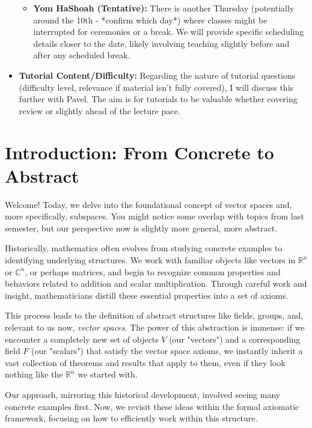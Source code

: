 \documentclass[11pt]{article}
\theoremstyle{definition}
\theoremstyle{remark}
\begin{document}
\begin{itemize}
\begin{itemize}
            \item \textbf{Yom HaShoah (Tentative):} There is another Thursday (potentially around the 10th - *confirm which day*) where classes might be interrupted for ceremonies or a break. We will provide specific scheduling details closer to the date, likely involving teaching slightly before and after any scheduled break.
        \end{itemize}
    \item \textbf{Tutorial Content/Difficulty:} Regarding the nature of tutorial questions (difficulty level, relevance if material isn't fully covered), I will discuss this further with Pavel. The aim is for tutorials to be valuable whether covering review or slightly ahead of the lecture pace.
\end{itemize}

\section{Introduction: From Concrete to Abstract}

Welcome! Today, we delve into the foundational concept of vector spaces and, more specifically, subspaces. You might notice some overlap with topics from last semester, but our perspective now is slightly more general, more abstract.

Historically, mathematics often evolves from studying concrete examples to identifying underlying structures. We work with familiar objects like vectors in $\mathbb{R}^n$ or $\mathbb{C}^n$, or perhaps matrices, and begin to recognize common properties and behaviors related to addition and scalar multiplication. Through careful work and insight, mathematicians distill these essential properties into a set of axioms.

This process leads to the definition of abstract structures like fields, groups, and, relevant to us now, \emph{vector spaces}. The power of this abstraction is immense: if we encounter a completely new set of objects $V$ (our "vectors") and a corresponding field $F$ (our "scalars") that satisfy the vector space axioms, we instantly inherit a vast collection of theorems and results that apply to them, even if they look nothing like the $\mathbb{R}^n$ we started with.

Our approach, mirroring this historical development, involved seeing many concrete examples first. Now, we revisit these ideas within the formal axiomatic framework, focusing on how to efficiently work within this structure.
\end{document}
